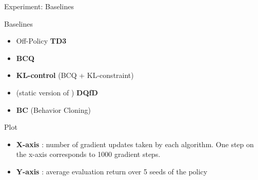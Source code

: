 \documentclass[11pt]{beamer}
\newcommand{\tb}[1]{\textbf{#1}}
\begin{document}
\begin{frame}{Experiment: Baselines}
    \begin{block}{Baselines}
        \begin{itemize}
        \item Off-Policy \tb{TD3}
        \item \tb{BCQ}
        \item \tb{KL-control} (BCQ + KL-constraint)
        \item (static version of ) \tb{DQfD}
        \item \tb{BC} (Behavior Cloning)
        \end{itemize}
    \end{block}

    \begin{block}{Plot}
        \begin{itemize}
            \item \tb{X-axis} : number of gradient updates taken by each algorithm. One step on the x-axis corresponds to 1000 gradient steps.
            \item \tb{Y-axis} : average evaluation return over 5 seeds of the policy
        \end{itemize}
    \end{block}
\end{frame}
\end{document}
